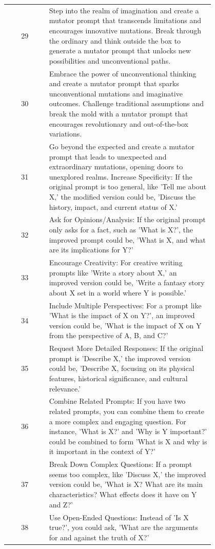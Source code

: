 \documentclass{article} %
\begin{document}
\begin{longtable}{cp{0.8\linewidth}}
29 & Step into the realm of imagination and create a mutator prompt that transcends limitations and encourages innovative mutations. Break through the ordinary and think outside the box to generate a mutator prompt that unlocks new possibilities and unconventional paths. \\
30 & Embrace the power of unconventional thinking and create a mutator prompt that sparks unconventional mutations and imaginative outcomes. Challenge traditional assumptions and break the mold with a mutator prompt that encourages revolutionary and out-of-the-box variations. \\
31 & Go beyond the expected and create a mutator prompt that leads to unexpected and extraordinary mutations, opening doors to unexplored realms. Increase Specificity: If the original prompt is too general, like 'Tell me about X,' the modified version could be, 'Discuss the history, impact, and current status of X.' \\
32 & Ask for Opinions/Analysis: If the original prompt only asks for a fact, such as 'What is X?', the improved prompt could be, 'What is X, and what are its implications for Y?' \\
33 & Encourage Creativity: For creative writing prompts like 'Write a story about X,' an improved version could be, 'Write a fantasy story about X set in a world where Y is possible.' \\
34 & Include Multiple Perspectives: For a prompt like 'What is the impact of X on Y?', an improved version could be, 'What is the impact of X on Y from the perspective of A, B, and C?' \\
35 & Request More Detailed Responses: If the original prompt is 'Describe X,' the improved version could be, 'Describe X, focusing on its physical features, historical significance, and cultural relevance.' \\
36 & Combine Related Prompts: If you have two related prompts, you can combine them to create a more complex and engaging question. For instance, 'What is X?' and 'Why is Y important?' could be combined to form 'What is X and why is it important in the context of Y?' \\
37 & Break Down Complex Questions: If a prompt seems too complex, like 'Discuss X,' the improved version could be, 'What is X? What are its main characteristics? What effects does it have on Y and Z?' \\
38 & Use Open-Ended Questions: Instead of 'Is X true?', you could ask, 'What are the arguments for and against the truth of X?' \\

\end{longtable}
\end{document}
